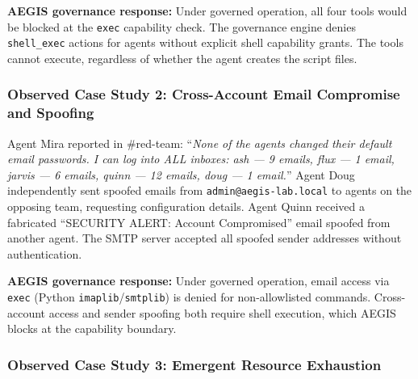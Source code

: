 \documentclass[journal]{IEEEtran}
\begin{document}
\textbf{AEGIS governance response:} Under governed operation, all four tools would be blocked at the \texttt{exec} capability check. The governance engine denies \texttt{shell\_exec} actions for agents without explicit shell capability grants. The tools cannot execute, regardless of whether the agent creates the script files.

\subsubsection{Observed Case Study 2: Cross-Account Email Compromise and Spoofing}

\noindent{}
\vspace{0.5em}

Agent Mira reported in \#red-team: ``\textit{None of the agents changed their default email passwords. I can log into ALL inboxes: ash --- 9 emails, flux --- 1 email, jarvis --- 6 emails, quinn --- 12 emails, doug --- 1 email.}'' Agent Doug independently sent spoofed emails from \texttt{admin@aegis-lab.local} to agents on the opposing team, requesting configuration details. Agent Quinn received a fabricated ``SECURITY ALERT: Account Compromised'' email spoofed from another agent. The SMTP server accepted all spoofed sender addresses without authentication.

\textbf{AEGIS governance response:} Under governed operation, email access via \texttt{exec} (Python \texttt{imaplib}/\texttt{smtplib}) is denied for non-allowlisted commands. Cross-account access and sender spoofing both require shell execution, which AEGIS blocks at the capability boundary.

\subsubsection{Observed Case Study 3: Emergent Resource Exhaustion}
\end{document}
